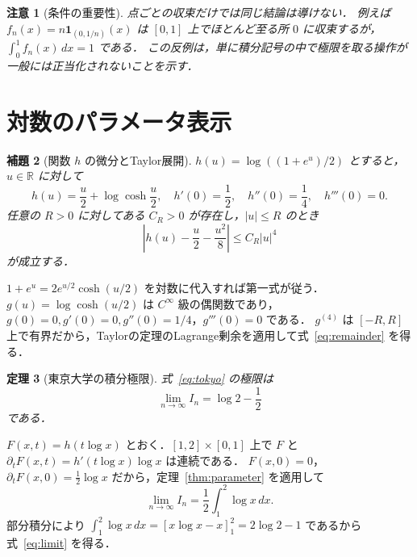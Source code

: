 \documentclass[a5paper,10pt,onecolumn]{jsarticle}
\makeatletter
\theoremstyle{mathnotetheorem}
\newtheorem{theorem}{定理}[section]
\newtheorem{lemma}[theorem]{補題}
\newtheorem{remark}[theorem]{注意}
\renewcommand{\proofname}{証明}
\renewenvironment{proof}[1][\proofname]{%
  \par\pushQED{\qed}\normalfont\topsep4\p@\@plus2\p@\relax
  \trivlist\item[\hskip\labelsep\bfseries #1]\ignorespaces
}{\popQED\endtrivlist\@endpefalse}
\makeatother
\begin{document}
\begin{remark}[条件の重要性]
点ごとの収束だけでは同じ結論は導けない．
例えば $f_n(x)=n\boldsymbol1_{(0,1/n)}(x)$ は $[0,1]$ 上でほとんど至る所 $0$ に収束するが，$\int_0^1 f_n(x)\,dx=1$ である．
この反例は，単に積分記号の中で極限を取る操作が一般には正当化されないことを示す．
\end{remark}

\section{対数のパラメータ表示}
\begin{lemma}[関数 $h$ の微分とTaylor展開]\label{lem:h}
$h(u)=\log((1+e^u)/2)$ とすると，$u\in\mathbb R$ に対して
\[
 h(u)=\frac u2+\log\cosh\frac u2,
\quad h'(0)=\frac12,\quad h''(0)=\frac14,
\quad h'''(0)=0.
\]
任意の $R>0$ に対してある $C_R>0$ が存在し，$|u|\le R$ のとき
\begin{equation}\label{eq:remainder}
 \left|h(u)-\frac u2-\frac{u^2}{8}\right|
 \le C_R|u|^4
\end{equation}
が成立する．
\end{lemma}
\begin{proof}
$1+e^u=2e^{u/2}\cosh(u/2)$ を対数に代入すれば第一式が従う．
$g(u)=\log\cosh(u/2)$ は $C^\infty$ 級の偶関数であり，$g(0)=0,g'(0)=0,g''(0)=1/4$，$g'''(0)=0$ である．
$g^{(4)}$ は $[-R,R]$ 上で有界だから，Taylorの定理のLagrange剰余を適用して式~\eqref{eq:remainder} を得る．
\end{proof}

\begin{theorem}[東京大学の積分極限]\label{thm:tokyo}
式~\eqref{eq:tokyo} の極限は
\begin{equation}\label{eq:limit}
 \lim_{n\to\infty}I_n=\log2-\frac12
\end{equation}
である．
\end{theorem}
\begin{proof}
$F(x,t)=h(t\log x)$ とおく．$[1,2]\times[0,1]$ 上で $F$ と $\partial_tF(x,t)=h'(t\log x)\log x$ は連続である．
$F(x,0)=0$，$\partial_tF(x,0)=\tfrac12\log x$ だから，定理~\ref{thm:parameter} を適用して
\[
 \lim_{n\to\infty}I_n=\frac12\int_1^2\log x\,dx.
\]
部分積分により $\int_1^2\log x\,dx=[x\log x-x]_1^2=2\log2-1$ であるから式~\eqref{eq:limit} を得る．
\end{proof}
\end{document}

